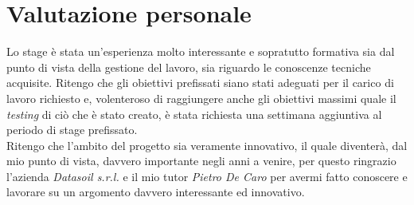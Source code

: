 \section{Valutazione personale}
Lo stage è stata un'esperienza molto interessante e sopratutto formativa sia dal punto di vista della gestione del lavoro, sia riguardo le conoscenze tecniche acquisite. Ritengo che gli obiettivi prefissati siano stati adeguati per il carico di lavoro richiesto e, volenteroso di raggiungere anche gli obiettivi massimi quale il \textit{testing} di ciò che è stato creato, è stata richiesta una settimana aggiuntiva al periodo di stage prefissato.\\
Ritengo che l'ambito del progetto sia veramente innovativo, il quale diventerà, dal mio punto di vista, davvero importante negli anni a venire, per questo ringrazio l'azienda \textit{Datasoil s.r.l.} e il mio tutor \textit{Pietro De Caro} per avermi fatto conoscere e lavorare su un argomento davvero interessante ed innovativo. 
